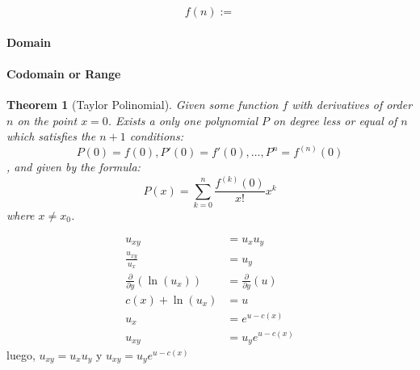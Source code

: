 \documentclass{article}
\newtheorem{theorem}{Theorem}[section]
\begin{document}
$$f(n):=$$

\paragraph{Domain}
\paragraph{Codomain or Range}

\begin{theorem}[Taylor Polinomial] Given some function $f$ with derivatives of order $n$ on the point $x=0$. Exists a only one polynomial $P$ on degree less or equal of $n$ which satisfies the $n + 1$ conditions:
	$$P(0) = f(0), P'(0)=f'(0), \dots, P^n = f^{(n)}(0)$$
, and given by the formula:
	$$P(x) = \sum_{k=0}^{n} \frac{f^{(k)}(0)}{x!}x^{k}$$
where $x \neq x_0$.
\end{theorem}

\begin{align*}
u_{xy} &= u_x u_y\\
\frac{u_{xy}}{u_x} &= u_y\\
\frac{\partial}{\partial y}\left(\ln (u_x)\right) &= \frac{\partial}{\partial y}\left(u\right)\\
c(x) + \ln(u_x) &= u\\
u_x &= e^{u - c(x)}\\
u_{xy} &= u_y e^{u-c(x)}
\end{align*}
luego,
$u_{xy} = u_x u_y$ y $u_{xy}= u_y e^{u-c(x)}$
\end{document}
